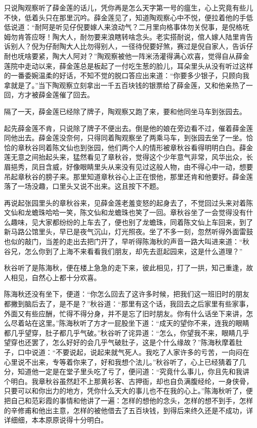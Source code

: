 \documentclass[12pt,UTF8]{ctexbook}
\begin{document}
{{{只说陶观察听了薛金莲的话儿，凭你再是怎么天字第一号的瘟生，心上究竟有些儿不快，低着头只在那里沉吟。薛金莲见了，知道陶观察心中不悦，便拉着他的手低低说道：“耐阿是听见仔倪要嫁人来浪动气？二月里向格事体勿关倪事，是倪格呒姆勿肯答应呀！陶大人，耐勿要来浪瞎转啥念头。老实搭耐说，倌人嫁人陆里肯告诉别人？倪为仔耐陶大人比勿得别人，一径待倪要好煞，赛过是倪自家人，告诉仔耐也呒啥要紧，陶大人阿对？”陶观察被他一阵米汤灌得满心欢喜，觉得自从薛金莲院中走动以来，薛金莲总是板起了一付吃生葱的脸儿，耳朵里头从没有听过这样的一番委婉温柔的好话，不知不觉的脱口答应出来道：“你要多少银子，只顾向我拿就是了。”当下陶观察立刻拿出一千五百块钱的银票给了薛金莲，又和他亲热了一回，方才被薛金莲催了回去。

隔了一天，薛金莲已经除了牌子，陶观察又跑了来，要和他同坐马车到张园去。

起先薛金莲不肯，只说除了牌子不便出去。倒是他的娘在旁边看不过，催着薛金莲同他出去。薛金莲没奈何，只得同着陶观察坐了两乘马车，到张园去坐了一坐。恰恰的章秋谷同着陈文仙也到张园，他们两个人的情形被章秋谷看得明明白白。薛金莲无意之间抬起头来，猛然看见了章秋谷，觉得这个少年意气非常，风华出众，长眉挹秀，凤目含威，好像眼睛里头从来没有见过这般人物，由不得心中一动，想要吊起章秋谷的膀子来。那里知道章秋谷心上正在恨他，那里还肯和他要好。薛金莲落了一场没趣，口里头又说不出来。这且按下不题。

再说起张园里头的章秋谷来，见薛金莲老羞变怒的起身去了，不觉回过头来对着陈文仙和龙蟾珠哈哈一笑，陈文仙和龙蟾珠也笑了一回。章秋谷坐了一会觉得没有什么趣味，见大家都纷纷的上车去了，便也别了龙蟾珠，同着陈文仙上车回来，到了新马路公馆里头，早已是夜气沉山，灯光照夜。坐了不多一刻，忽然听得外面雷鼓也似的敲门，当差的走出去把门开了，早听得陈海秋的声音一路大叫进来道：“秋谷兄，怎么你到了上海不来看看我们朋友，却先去逛起园来，这是什么道理？”

秋谷听了是陈海秋，便在楼上急急的走下来，彼此相见，打了一拱，知己重逢，故人相见，自然心上都十分欢喜。

陈海秋还没有坐下，便道：“你怎么回去了这许多时候，把我们这一班旧时的朋友都撇到脑后去了，是不是？”秋谷道：“那里有这个话，我回去之后家里有些家事，外面又有些应酬，忙得不得分身，并不是忘了旧时朋友。你有什么话坐下来讲，怎么尽着站在这里。”陈海秋听了方才一屁股坐下道：“成天的望你不来，连我的眼睛都几乎望穿，肚子都几乎气破。”秋谷听了诧异道：“怎么，你望我不来，眼睛几乎望穿也还罢了，怎么好好的会几乎气破肚子，这是个什么缘故？”陈海秋摩着肚子，口中说道：“不要说起，说起来就气死人。我吃了人家许多的亏苦，一向闷在心里说不出来，专等着你来了，好和我想个法儿。”秋谷听了，心上已经猜着了几分，知道他一定是在堂子里头吃了亏了，便问道：“究竟什么事儿，你且先和我讲个明白。我章秋谷虽然赶不上那黄衫客、古押衙，却也自负满腹经纶，一身侠骨，只要可以和你出力的地方，凭你什么天大的事儿也不在我的心上。”陈海秋听了，便把自己和范彩霞的事情和他讲了一遍：怎样的想他的念头，怎样的想不到手，怎样的辛修甫和他出主意，怎样的被他借去了五百块钱，到得后来终久还是不成功，详详细细，本本原原说得十分明白。

}}}
\end{document}

